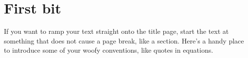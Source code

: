 \documentclass[11pt,notitlepage]{report}
\title{\titletext}
\author{Tyrone Lagore}
\date{\today}
\begin{document}
	\maketitle
	\thispagestyle{empty}

	\begin{abstract}
		The WHO states that heart disease is the number one cause of death globally.
	\end{abstract}

	\section*{First bit}
	If you want to ramp your text straight onto the title page, start the text at 
something that does not cause a page break, like a section.  Here's a handy 
place to introduce some of your woofy conventions, like quotes in equations.

	\newpage 
 	
 	
\end{document}
